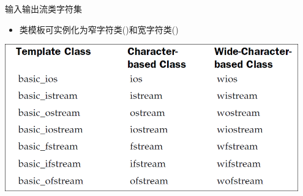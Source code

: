 \begin{frame}[t, fragile]{输入输出流类}{字符集}%
  \begin{itemize}
  \item 类模板可实例化为窄字符类()和宽字符类()
  \end{itemize}
  \begin{center}
    \includegraphics[width=0.95\textwidth]{figure/chap08/04charset}
  \end{center}
\end{frame}

